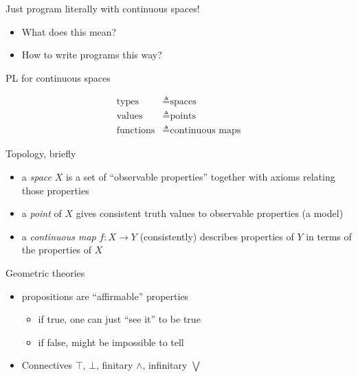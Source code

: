 \documentclass[14pt, notes]{beamer}
\begin{document}
\begin{frame}
\begin{center}
\huge Just program literally with continuous spaces!
\end{center}

\bigskip
\pause

\begin{itemize}
\item What does this mean?
\item How to write programs this way?
\end{itemize}
\end{frame}

\begin{frame}{PL for continuous spaces}

\begin{center}
\Large
\begin{align*}
\text{types} &\triangleq \text{spaces}
\\
\text{values} &\triangleq \text{points}
\\
\text{functions} &\triangleq \text{continuous maps}
\end{align*}
\end{center}
\end{frame}

\begin{frame}{Topology, briefly}
\begin{itemize}
\item a \emph{space} $X$ is a set of ``observable properties'' together with axioms relating those properties
\bigskip
\item a \emph{point} of $X$ gives consistent truth values to observable properties (a model)
\bigskip
\item a \emph{continuous map} $f : X \to Y$ (consistently) describes properties of $Y$ in terms of the properties of $X$
\end{itemize}
\end{frame}

\begin{frame}{Geometric theories}
\begin{itemize}
\item propositions are ``affirmable'' properties
\begin{itemize}
  \item if true, one can just ``see it'' to be true
  \item if false, might be impossible to tell
\end{itemize}
\bigskip
\item Connectives $\top$, $\bot$, finitary $\wedge$, infinitary $\bigvee$
\end{itemize}
\end{frame}
\end{document}
